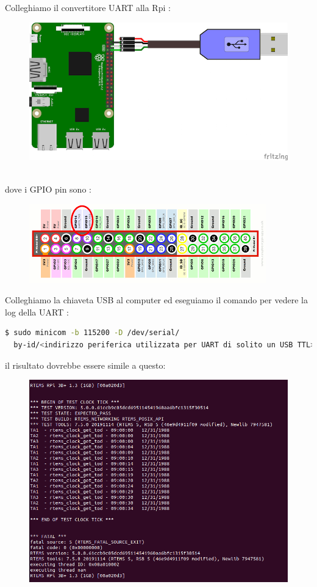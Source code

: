 \documentclass[12pt, a4paper]{article}
\begin{document}
\begin{flushleft}
Colleghiamo il convertitore UART alla Rpi :
\begin{figure}[h!]
\includegraphics[width=\linewidth]{rpi-uart-usb.png}
\end{figure}
\\
dove i GPIO pin sono :
\begin{figure}[h!]
\includegraphics[width=\linewidth]{rpi-gpio.png}
\end{figure}

\newpage
Colleghiamo la chiaveta USB al computer ed eseguiamo il comando per vedere la log della UART :
\begin{lstlisting}[language=bash] 
$ sudo minicom -b 115200 -D /dev/serial/
  by-id/<indirizzo periferica utilizzata per UART di solito un USB TTL>
\end{lstlisting}

il risultato dovrebbe essere simile a questo:
\begin{figure}[h!]
\includegraphics[width=\linewidth]{risultato-ticker.png}
\end{figure}


\end{flushleft}
\end{document}
